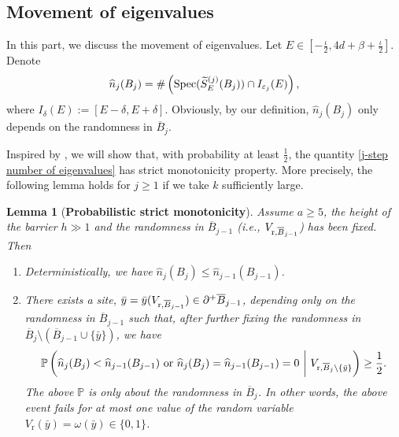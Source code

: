 \documentclass[11pt,reqno,UTF8,twoside]{amsart}
\newcommand{\spec}{{\rm Spec}}
\renewcommand{\P}{\mathbb{P}}
\newcommand{\mcF}{\mathcal{F}}
\newcommand{\mcS}{\mathcal{S}}
\newcommand{\whn}{\widehat{n}}
\newcommand{\barB}{\overline{B}}
\newcommand{\wtSj}{\widetilde{S}^{(j)}}
\newtheorem{lem}[thm]{Lemma}
\theoremstyle{definition}
\numberwithin{equation}{section}
\begin{document}
\subsection{Movement of eigenvalues}
In this part,  we discuss the movement of eigenvalues. Let $E\in [-\frac{\iota}{2},4d+\beta+\frac{\iota}{2}]$. Denote 
\begin{equation}\label{j-step number of eigenvalues}
  \whn_j(B_j)=\#\left(\spec(\wtSj_E(B_j) )\cap  I_{\varepsilon_{j}}(E)\right),
\end{equation}
where  $I_{\delta}(E):=[E-\delta,E+\delta]$. Obviously, by our definition,  $\whn_j(B_j)$ only depends on the randomness in $\barB_j$.



Inspired by \cite[Proposition 3.2]{Imb21}, we will show that, with probability at least $\frac{1}{2}$, the quantity \eqref{j-step number of eigenvalues} has strict monotonicity property. More precisely, the following lemma holds for $j\geq 1$ if we take $k$ sufficiently large. 
\begin{lem}[{\bf Probabilistic strict monotonicity}]\label{monotonicity lemma}
Assume $a\geq 5$, the height of the barrier $h\gg1$  and the randomness in $\barB_{j-1}$ (i.e.,  $V_{{\rm r},\barB_{j-1}}$) has been fixed.  Then 
  \begin{enumerate}
    \item Deterministically,  we have $\whn_{j}(B_j)\leq \whn_{j-1}(B_{j-1})$.
    \item There exists  a site, $\bar{y}=\bar{y}(V_{{\rm r},\barB_{j-1}})\in \partial^+\barB_{j-1}$, depending only on the randomness in $\barB_{j-1}$ such that,  after further fixing the randomness in $\barB_{j}\setminus (\barB_{j-1}\cup\{\bar{y}\})$, we have
  \begin{equation}\label{monotonicity probabilistic estimate}
    \P\left(\whn_{j}(B_{j}) <\whn_{j-1}(B_{j-1}) \ {\rm or}\ \whn_{j}(B_{j}) =\whn_{j-1}(B_{j-1})=0 \  \bigg| \ V_{{\rm r},\barB_{j}\setminus \{\bar{y}\} } \right)\geq \frac{1}{2}.
  \end{equation}
  The above $\P$ is only about the randomness in $\barB_j$. In other words, the above event fails for at most one value of the random variable $V_{\text{r}}(\bar{y})=\omega(\bar{y})\in \{0,1\}$.
  \end{enumerate}
\end{lem}
\end{document}
